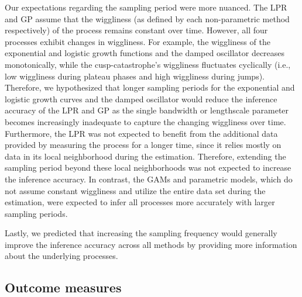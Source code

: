 \documentclass[man, floatsintext]{apa7}
\begin{document}
Our expectations regarding the sampling period were more nuanced. The LPR and
GP assume that the wiggliness (as defined by each non-parametric method
respectively) of the process remains constant over time. However, all four
processes exhibit changes in wiggliness. For example, the wiggliness of the
exponential and logistic growth functions and the damped oscillator decreases
monotonically, while the cusp-catastrophe's wiggliness fluctuates cyclically
(i.e., low wiggliness during plateau phases and high wiggliness during jumps).
Therefore, we hypothesized that longer sampling periods for the exponential and
logistic growth curves and the damped oscillator would reduce the inference
accuracy of the LPR and GP as the single bandwidth or lengthscale parameter
becomes increasingly inadequate to capture the changing wiggliness over time.
Furthermore, the LPR was not expected to benefit from the additional
data provided by measuring the process for a longer time, since it relies
mostly on data in its local neighborhood during the estimation. Therefore,
extending the sampling period beyond these local neighborhoods was not expected
to increase the inference accuracy. In contrast, the GAMs and parametric
models, which do not assume constant wiggliness and utilize the entire data set
during the estimation, were expected to infer all processes more accurately
with larger sampling periods.

Lastly, we predicted that increasing the sampling frequency would generally
improve the inference accuracy across all methods by providing more information
about the underlying processes.

\subsection{Outcome measures}
\end{document}
